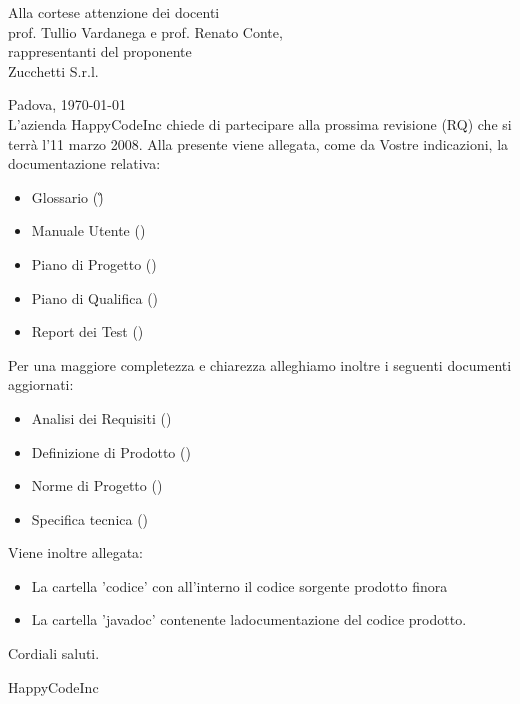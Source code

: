 


\newcommand{\dt}{ Lettera di accompagnamento }%




\thispagestyle{plain}
\begin{flushright}
Alla cortese attenzione dei docenti\\
prof. Tullio Vardanega e prof. Renato Conte,\\
rappresentanti del proponente\\
Zucchetti S.r.l.
\end{flushright}
Padova, \today \\

L'azienda HappyCodeInc chiede di partecipare alla prossima revisione (RQ) che si terr\`a l'11 marzo 2008.
Alla presente viene allegata, come da Vostre indicazioni, la documentazione relativa:
\begin{itemize}
\item{}Glossario (\G)
\item{}Manuale Utente (\MU)
\item{}Piano di Progetto (\PdP)
\item{}Piano di Qualifica (\PdQ)
\item{}Report dei Test (\TR)
\end{itemize}
Per una maggiore completezza e chiarezza alleghiamo inoltre i seguenti documenti aggiornati:
\begin{itemize}
\item{}Analisi dei Requisiti (\AR)
\item{}Definizione di Prodotto (\DdP)
\item{}Norme di Progetto (\NdP)
\item{}Specifica tecnica (\ST) 
\end{itemize}
Viene inoltre allegata:
\begin{itemize}
\item{La  cartella 'codice' con all'interno il codice sorgente prodotto finora}
\item{La cartella 'javadoc' contenente ladocumentazione del codice prodotto.}
\end{itemize}

Cordiali saluti.
\begin{flushright}
HappyCodeInc
\end{flushright}
\newpage


